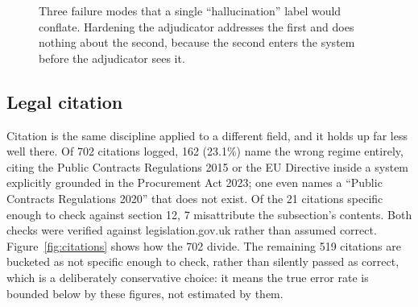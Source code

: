 \begin{figure}[htbp]
\centering
{}
\caption[Failure mode taxonomy]{Three failure modes that a single ``hallucination''
label would conflate. Hardening the adjudicator addresses the first and does
nothing about the second, because the second enters the system before the
adjudicator sees it.}
\label{fig:failures}
\end{figure}

\subsection{Legal citation}
\label{sec:citation}

Citation is the same discipline applied to a different field, and it holds up
far less well there. Of 702 citations logged, 162 (23.1\%) name the wrong regime
entirely, citing the Public Contracts Regulations 2015 or the EU Directive
inside a system explicitly grounded in the Procurement Act 2023; one even names
a ``Public Contracts Regulations 2020'' that does not exist. Of the 21
citations specific enough to check against section 12, 7 misattribute the
subsection's contents. Both checks were verified against legislation.gov.uk
rather than assumed correct. Figure~\ref{fig:citations} shows how the 702 divide.
The remaining 519 citations are bucketed as not
specific enough to check, rather than silently passed as correct, which is a
deliberately conservative choice: it means the true error rate is bounded below
by these figures, not estimated by them.

